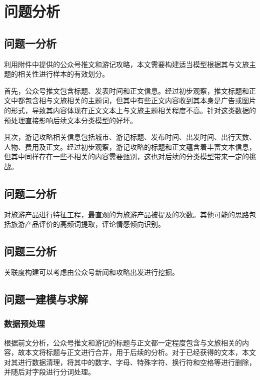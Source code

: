 \documentclass[bwprint]{gmcmthesis}
\begin{document}
\section{问题分析}

\subsection{问题一分析}
利用附件中提供的公众号推文和游记攻略，本文需要构建适当模型根据其与文旅主题的相关性进行样本的有效划分。

首先，公众号推文包含标题、发表时间和正文信息。经过初步观察，推文标题和正文中都包含相与文旅相关的主题词，但其中有些正文内容收到其本身是广告或图片的形式，导致其内容体现在正文文本上与文旅主题相关程度不高。针对这类数据的预处理直接影响后续文本分类模型的好坏。

其次，游记攻略相关信息包括城市、游记标题、发布时间、出发时间、出行天数、人物、费用及正文。经过初步观察，游记攻略的标题和正文蕴含着丰富文本信息，但其中同样存在一些不相关的内容需要甄别，这也对后续的分类模型带来一定的挑战。


\subsection{问题二分析}
对旅游产品进行特征工程，最直观的为旅游产品被提及的次数。其他可能的思路包括旅游产品评价的高频词提取，评论情感倾向识别。



\subsection{问题三分析}
关联度构建可以考虑由公众号新闻和攻略出发进行挖掘。

\subsection{问题一建模与求解}

\subsubsection{数据预处理}

根据前文分析，公众号推文和游记的标题与正文都一定程度包含与文旅相关的内容，故本文将标题与正文进行合并，用于后续的分析。对于已经获得的文本，本文对其进行数据清理，将其中的数字、字母、特殊字符、换行符和空格等进行删除，并随后对字段进行分词处理。
\end{document}
